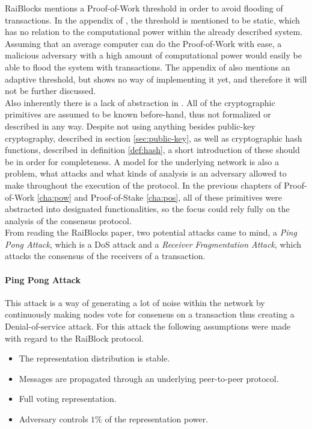 RaiBlocks \cite{raiblocks} mentions a Proof-of-Work threshold in order to avoid flooding of transactions. In the appendix of \cite{raiblocks}, the threshold is mentioned to be static, which has no relation to the computational power within the already described system. Assuming that an average computer can do the Proof-of-Work with ease, a malicious adversary with a high amount of computational power would easily be able to flood the system with transactions. The appendix of \cite{raiblocks} also mentions an adaptive threshold, but shows no way of implementing it yet, and therefore it will not be further discussed. \\

Also inherently there is a lack of abstraction in \cite{raiblocks}. All of the cryptographic primitives are assumed to be known before-hand, thus not formalized or described in any way. Despite not using anything besides public-key cryptography, described in section \ref{sec:public-key}, as well as cryptographic hash functions, described in definition \ref{def:hash}, a short introduction of these should be in order for completeness. A model for the underlying network is also a problem, what attacks and what kinds of analysis is an adversary allowed to make throughout the execution of the protocol. In the previous chapters of Proof-of-Work \ref{cha:pow} and Proof-of-Stake \ref{cha:pos}, all of these primitives were abstracted into designated functionalities, so the focus could rely fully on the analysis of the consensus protocol.\\

From reading the RaiBlocks paper, two potential attacks came to mind, a \emph{Ping Pong Attack}, which is a DoS attack and a \emph{Receiver Fragmentation Attack}, which attacks the consensus of the receivers of a transaction.
\paragraph{Ping Pong Attack}
This attack is a way of generating a lot of noise within the network by continuously making nodes vote for consensus on a transaction thus creating a Denial-of-service attack. For this attack the following assumptions were made with regard to the RaiBlock protocol.
\begin{itemize}
    \item The representation distribution is stable.
    \item Messages are propagated through an underlying peer-to-peer protocol.
    \item Full voting representation.
    \item Adversary controls $1\%$ of the representation power.
\end{itemize}

